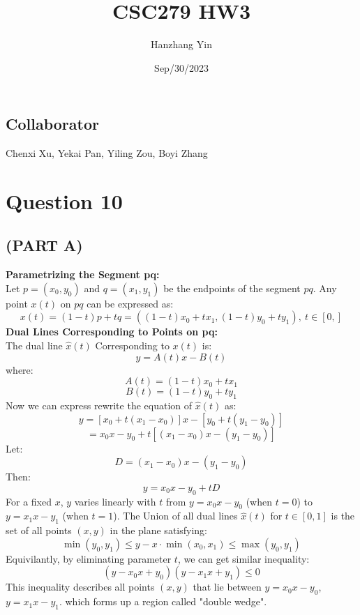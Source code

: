 \documentclass{article}
\title{CSC279 HW3}
\author{Hanzhang Yin}
\date{Sep/30/2023}
\begin{document}
\maketitle

\subsection*{Collaborator}
Chenxi Xu, Yekai Pan, Yiling Zou, Boyi Zhang

\section*{Question 10}

\subsection*{(PART A)}
\textbf{Parametrizing the Segment pq: }
\\
Let $p = (x_0, y_0)$ and $q = (x_1, y_1)$ be the endpoints of the segment $pq$. Any point $x(t)$ on $pq$ can 
be expressed as: 
\[ x(t) = (1 - t)p + tq = ((1 - t)x_0 + tx_1, (1 - t)y_0 + ty_1), \ t \in [0, ] \]
\textbf{Dual Lines Corresponding to Points on pq: }
\\
The dual line $\hat{x}(t)$ Corresponding to $x(t)$ is:
\[ y = A(t)x - B(t) \]
where:
\[ A(t) = (1 - t)x_0 + tx_1 \]
\[ B(t) = (1 - t)y_0 + ty_1 \]
Now we can express rewrite the equation of $\hat{x}(t)$ as:
\[ y = [x_0 + t(x_1 - x_0)]x - [y_0 + t(y_1 - y_0)] \]
\[ = x_0x - y_0 + t[(x_1 - x_0)x - (y_1 - y_0)] \]
Let:
\[ D = (x_1 - x_0)x - (y_1 - y_0) \]
Then:
\[ y = x_0x - y_0 + tD \]
For a fixed $x$, $y$ varies linearly with $t$ from $y = x_0x - y_0$ (when $t = 0$) to $y = x_1x - y_1$ (when $t = 1$).
The Union of all dual lines $\hat{x}(t)$ for $t \in [0,1]$ is the set of all points $(x, y)$ in the plane satisfying:
\[ \min(y_0, y_1) \leq y - x \cdot \min(x_0, x_1) \leq \max(y_0, y_1) \]
Equivilantly, by eliminating parameter $t$, we can get similar inequality:
\[ (y - x_0x + y_0)(y - x_1x + y_1) \leq 0 \]
This inequality describes all points $(x, y)$ that lie between $y = x_0x - y_0$, $y = x_1x - y_1$. 
which forms up a region called "double wedge".

\newpage
\end{document}

